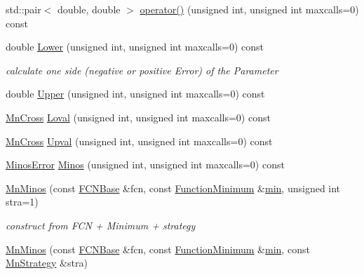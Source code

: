 \begin{DoxyCompactItemize}
\item 
std\+::pair$<$ double, double $>$ \mbox{\hyperlink{classROOT_1_1Minuit2_1_1MnMinos_a82c85ed2e8212675339ffcc2a5bb61cb}{operator()}} (unsigned int, unsigned int maxcalls=0) const
\item 
double \mbox{\hyperlink{classROOT_1_1Minuit2_1_1MnMinos_a0e6c6ab67bdd7b3461d900f64b4908ba}{Lower}} (unsigned int, unsigned int maxcalls=0) const
\begin{DoxyCompactList}\small\item\em calculate one side (negative or positive Error) of the Parameter \end{DoxyCompactList}\item 
double \mbox{\hyperlink{classROOT_1_1Minuit2_1_1MnMinos_a387b76e3135998c519db7e6ae4cc3d90}{Upper}} (unsigned int, unsigned int maxcalls=0) const
\item 
\mbox{\hyperlink{classROOT_1_1Minuit2_1_1MnCross}{Mn\+Cross}} \mbox{\hyperlink{classROOT_1_1Minuit2_1_1MnMinos_a708381f90e4bd9118dec60726a1bdf73}{Loval}} (unsigned int, unsigned int maxcalls=0) const
\item 
\mbox{\hyperlink{classROOT_1_1Minuit2_1_1MnCross}{Mn\+Cross}} \mbox{\hyperlink{classROOT_1_1Minuit2_1_1MnMinos_a6fb073e7f84cb2d038714e362eda732a}{Upval}} (unsigned int, unsigned int maxcalls=0) const
\item 
\mbox{\hyperlink{classROOT_1_1Minuit2_1_1MinosError}{Minos\+Error}} \mbox{\hyperlink{classROOT_1_1Minuit2_1_1MnMinos_aeb1fe39f5851b5af050191d812d21723}{Minos}} (unsigned int, unsigned int maxcalls=0) const
\item 
\mbox{\hyperlink{classROOT_1_1Minuit2_1_1MnMinos_ac64ec75423efa6e473ee722f08f47eb4}{Mn\+Minos}} (const \mbox{\hyperlink{classROOT_1_1Minuit2_1_1FCNBase}{F\+C\+N\+Base}} \&fcn, const \mbox{\hyperlink{classROOT_1_1Minuit2_1_1FunctionMinimum}{Function\+Minimum}} \&\mbox{\hyperlink{adat__devel_2lib_2SU3_2SU3__internal_8h_ab0f5fed3171eb00d1c5f037d9f518a23}{min}}, unsigned int stra=1)
\begin{DoxyCompactList}\small\item\em construct from F\+CN + Minimum + strategy \end{DoxyCompactList}\item 
\mbox{\hyperlink{classROOT_1_1Minuit2_1_1MnMinos_a80f912ade0dd48d937bc04b14e28623c}{Mn\+Minos}} (const \mbox{\hyperlink{classROOT_1_1Minuit2_1_1FCNBase}{F\+C\+N\+Base}} \&fcn, const \mbox{\hyperlink{classROOT_1_1Minuit2_1_1FunctionMinimum}{Function\+Minimum}} \&\mbox{\hyperlink{adat__devel_2lib_2SU3_2SU3__internal_8h_ab0f5fed3171eb00d1c5f037d9f518a23}{min}}, const \mbox{\hyperlink{classROOT_1_1Minuit2_1_1MnStrategy}{Mn\+Strategy}} \&stra)

\end{DoxyCompactItemize}
